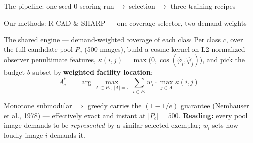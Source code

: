 \documentclass[aspectratio=169]{beamer}
\begin{document}
\begin{frame}{The pipeline: one seed-0 scoring run $\to$ selection $\to$ three training recipes}
\end{frame}

\begin{frame}{Our methods: R-CAD \& SHARP --- one coverage selector, two demand weights}

    \begin{block}{The shared engine --- demand-weighted coverage of each class}
    \tiny
    Per class $c$, over the full candidate pool $P_c$ (500 images), build a cosine kernel on
    L2-normalized observer penultimate features, $\kappa(i,j)=\max\!\big(0,\cos(\hat\varphi_i,\hat\varphi_j)\big)$,
    and pick the budget-$b$ subset by \textbf{weighted facility location}:
    \vspace{-0.15cm}
    $$A_c^{*} \;=\; \arg\max_{A\subset P_c,\ |A|=b}\ \sum_{i\in P_c} w_i\cdot\max_{j\in A}\kappa(i,j)$$
    \vspace{-0.4cm}

    Monotone submodular $\Rightarrow$ greedy carries the $(1-1/e)$ guarantee (Nemhauser et al., 1978) ---
    effectively exact and instant at $|P_c|=500$. \textbf{Reading:} every pool image demands to be
    \emph{represented} by a similar selected exemplar; $w_i$ sets how loudly image $i$ demands it.
    \end{block}


\end{frame}
\end{document}
